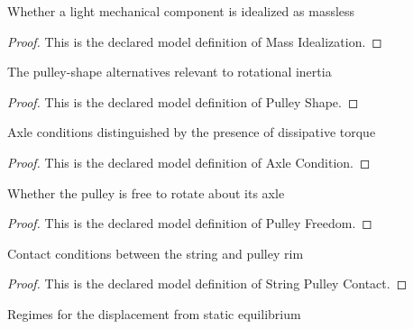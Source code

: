 \begin{definition}
  \label{def:physics:phyx-mini-0235:phyxminiproblems-problemphyxmini0235-massidealization}
  Whether a light mechanical component is idealized as massless
\end{definition}
\begin{proof}
  This is the declared model definition of Mass Idealization.
\end{proof}
\begin{definition}
  \label{def:physics:phyx-mini-0235:phyxminiproblems-problemphyxmini0235-pulleyshape}
  The pulley-shape alternatives relevant to rotational inertia
\end{definition}
\begin{proof}
  This is the declared model definition of Pulley Shape.
\end{proof}
\begin{definition}
  \label{def:physics:phyx-mini-0235:phyxminiproblems-problemphyxmini0235-axlecondition}
  Axle conditions distinguished by the presence of dissipative torque
\end{definition}
\begin{proof}
  This is the declared model definition of Axle Condition.
\end{proof}
\begin{definition}
  \label{def:physics:phyx-mini-0235:phyxminiproblems-problemphyxmini0235-pulleyfreedom}
  Whether the pulley is free to rotate about its axle
\end{definition}
\begin{proof}
  This is the declared model definition of Pulley Freedom.
\end{proof}
\begin{definition}
  \label{def:physics:phyx-mini-0235:phyxminiproblems-problemphyxmini0235-stringpulleycontact}
  Contact conditions between the string and pulley rim
\end{definition}
\begin{proof}
  This is the declared model definition of String Pulley Contact.
\end{proof}
\begin{definition}
  \label{def:physics:phyx-mini-0235:phyxminiproblems-problemphyxmini0235-oscillationregime}
  Regimes for the displacement from static equilibrium
\end{definition}
